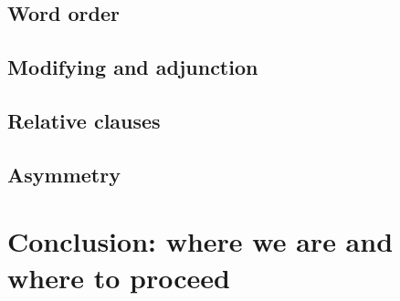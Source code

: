 \documentclass[a4paper]{article}
\begin{document}
\subsection{Word order}

\subsection{Modifying and adjunction}

\subsection{Relative clauses}

\subsection{Asymmetry}


\section{Conclusion: where we are and where to proceed}

\end{document}
